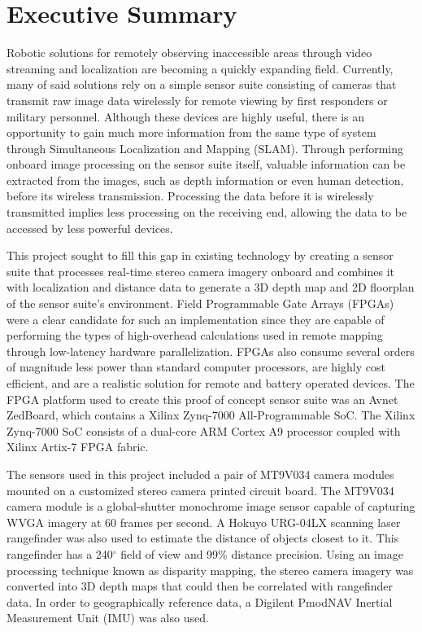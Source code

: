 {}
\section*{Executive Summary}

Robotic solutions for remotely observing inaccessible areas through video streaming and localization are becoming a quickly expanding field. Currently, many of said solutions rely on a simple sensor suite consisting of cameras that transmit raw image data wirelessly for remote viewing by first responders or military personnel. Although these devices are highly useful, there is an opportunity to gain much more information from the same type of system through Simultaneous Localization and Mapping (SLAM). Through performing onboard image processing on the sensor suite itself, valuable information can be extracted from the images, such as depth information or even human detection, before its wireless transmission. Processing the data before it is wirelessly transmitted implies less processing on the receiving end, allowing the data to be accessed by less powerful devices.
\par
This project sought to fill this gap in existing technology by creating a sensor suite that processes real-time stereo camera imagery onboard and combines it with localization and distance data to generate a 3D depth map and 2D floorplan of the sensor suite's environment. Field Programmable Gate Arrays (FPGAs) were a clear candidate for such an implementation since they are capable of performing the types of high-overhead calculations used in remote mapping through low-latency hardware parallelization. FPGAs also consume several orders of magnitude less power than standard computer processors, are highly cost efficient, and are a realistic solution for remote and battery operated devices. The FPGA platform used to create this proof of concept sensor suite was an Avnet ZedBoard, which contains a Xilinx Zynq-7000 All-Programmable SoC. The Xilinx Zynq-7000 SoC consists of a dual-core ARM Cortex A9 processor coupled with Xilinx Artix-7 FPGA fabric.
\par
The sensors used in this project included a pair of MT9V034 camera modules mounted on a customized stereo camera printed circuit board. The MT9V034 camera module is a global-shutter monochrome image sensor capable of capturing WVGA imagery at 60 frames per second. A Hokuyo URG-04LX scanning laser rangefinder was also used to estimate the distance of objects closest to it. This rangefinder has a 240$^\circ$ field of view and 99\% distance precision. Using an image processing technique known as disparity mapping, the stereo camera imagery was converted into 3D depth maps that could then be correlated with rangefinder data. In order to geographically reference data, a Digilent PmodNAV Inertial Measurement Unit (IMU) was also used. 
